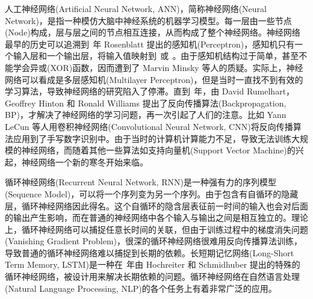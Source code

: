 \documentclass[12pt,a4paper]{article}
\begin{document}
{\hei 人工神经网络}({\crimson Artificial Neural Network, ANN})，简称{\hei 神经网络}({\crimson Neural Network})，是指一种模仿大脑中神经系统的机器学习模型。每一层由一些{\hei 节点}({\crimson Node})构成，层与层之间的节点相互连接，从而构成了整个神经网络。神经网络最早的历史可以追溯到$\:${}$\:$年 {\crimson Rosenblatt} 提出的{\hei 感知机}({\crimson Perceptron}){\kai \cite{rosenblatt1958perceptron}}，感知机只有一个输入层和一个输出层，将输入值映射到$\:${}$\:$或$\:${}$\:$。由于感知机结构过于简单，甚至不能学会{\hei 异或}({\crimson XOR})函数，因而遭到了 {\crimson Marvin Minsky}  等人的质疑{\kai \cite{minsky1969perceptrons}}。实际上，神经网络可以看成是{\hei 多层感知机}({\crimson Multilayer Perceptron})，但是当时一直找不到有效的学习算法，导致神经网络的研究陷入了停滞。直到$\:${}$\:$年，由 {\crimson David Rumelhart}，{\crimson Geoffrey Hinton} 和 {\crimson Ronald Williams} 提出了{\hei 反向传播算法}({\crimson Backpropagation, BP}){\kai \cite{rumelhart1986learning}}，才解决了神经网络的学习问题，再一次引起了人们的注意。比如 {\crimson Yann LeCun} 等人用{\hei 卷积神经网络}({\crimson Convolutional Neural Network, CNN})将反向传播算法应用到了手写数字识别中{\kai \cite{lecun1989backpropagation}}。由于当时的计算机计算能力不足，导致无法训练大规模的神经网络，而随着其他一些算法如{\hei 支持向量机}({\crimson Support Vector Machine})的兴起，神经网络一个新的寒冬开始来临。

{\hei 循环神经网络}({\crimson Recurrent Neural Network, RNN})是一种强有力的{\hei 序列模型}({\crimson Sequence Model})，可以将一个序列变为另一个序列。由于包含有自循环的隐藏层，循环神经网络因此得名。这个自循环的隐含层表征前一时间的输入也会对后面的输出产生影响，而在普通的神经网络中各个输入与输出之间是相互独立的。理论上，循环神经网络可以捕捉任意长时间的关联，但由于训练过程中的{\hei 梯度消失问题}({\crimson Vanishing Gradient Problem}){\kai \cite{hochreiter1991untersuchungen,bengio1993problem,bengio1994learning,hochreiter2001gradient}}，很深的循环神经网络很难用反向传播算法训练，导致普通的循环神经网络难以捕捉到长期的依赖。{\hei 长短期记忆网络}({\crimson Long-Short Term Memory, LSTM}){\kai \cite{hochreiter1997long}}是一种在$\:${}$\:$年由  {\crimson Hochreiter} 和 {\crimson Schmidhuber} 提出的特殊的循环神经网络，被设计用来解决长期依赖的问题。循环神经网络在{\hei 自然语言处理}({\crimson Natural Language Processing, NLP})的各个任务上有着非常广泛的应用。
\end{document}

